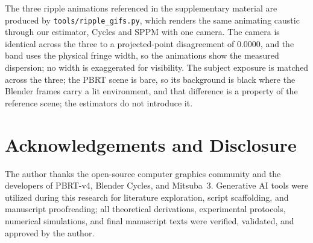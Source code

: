 The three ripple animations referenced in the supplementary material are
produced by \verb|tools/ripple_gifs.py|, which renders the same animating
caustic through our estimator, Cycles and SPPM with one camera. The camera is
identical across the three to a projected-point disagreement of \num{0.0000}, and the band uses the physical fringe width, so the animations show the measured dispersion; no width is exaggerated for visibility. The subject exposure is
matched across the three; the PBRT scene is bare, so its background is black
where the Blender frames carry a lit environment, and that difference is a property of the reference scene; the estimators do not introduce it.

\section*{Acknowledgements and Disclosure}

The author thanks the open-source computer graphics community and the developers
of PBRT-v4, Blender Cycles, and Mitsuba~3. Generative AI tools were utilized during
this research for literature exploration, script scaffolding, and manuscript proofreading;
all theoretical derivations, experimental protocols, numerical simulations, and final
manuscript texts were verified, validated, and approved by the author.
